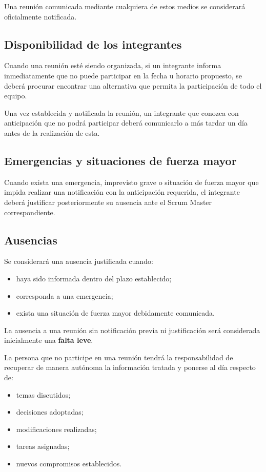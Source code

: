 \documentclass[12pt,a4paper]{article}
\begin{document}
Una reunión comunicada mediante cualquiera de estos medios se considerará oficialmente notificada.

\subsection{Disponibilidad de los integrantes}

Cuando una reunión esté siendo organizada, si un integrante informa inmediatamente que no puede participar en la fecha u horario propuesto, se deberá procurar encontrar una alternativa que permita la participación de todo el equipo.

Una vez establecida y notificada la reunión, un integrante que conozca con anticipación que no podrá participar deberá comunicarlo a más tardar un día antes de la realización de esta.

\subsection{Emergencias y situaciones de fuerza mayor}

Cuando exista una emergencia, imprevisto grave o situación de fuerza mayor que impida realizar una notificación con la anticipación requerida, el integrante deberá justificar posteriormente su ausencia ante el Scrum Master correspondiente.
\subsection{Ausencias}

Se considerará una ausencia justificada cuando:

\begin{itemize}
    \item haya sido informada dentro del plazo establecido;
    \item corresponda a una emergencia;
    \item exista una situación de fuerza mayor debidamente comunicada.
\end{itemize}

La ausencia a una reunión sin notificación previa ni justificación será considerada inicialmente una \textbf{falta leve}.

La persona que no participe en una reunión tendrá la responsabilidad de recuperar de manera autónoma la información tratada y ponerse al día respecto de:

\begin{itemize}
    \item temas discutidos;
    \item decisiones adoptadas;
    \item modificaciones realizadas;
    \item tareas asignadas;
    \item nuevos compromisos establecidos.
\end{itemize}
\end{document}
